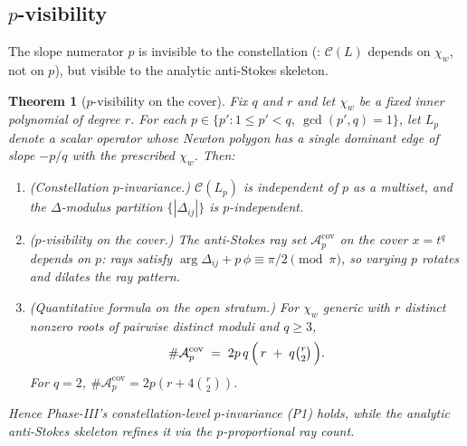 \documentclass[11pt,a4paper]{article}
\theoremstyle{plain}
\newtheorem{theorem}{Theorem}[section]
\theoremstyle{definition}
\theoremstyle{remark}
\newcommand{\Cl}{\mathcal{C}}
\newcommand{\Acov}{\mathcal{A}^{\mathrm{cov}}}
\newcommand{\Dij}{\Delta_{ij}}
\DeclareMathOperator{\arginline}{arg}
\begin{document}
\subsection{\texorpdfstring{$p$-visibility}{p-visibility}}\label{ssec:AT7}

The slope numerator $p$ is invisible to the constellation
(: $\Cl(L)$ depends on $\chi_w$, not on $p$), but
visible to the analytic anti-Stokes skeleton.

\begin{theorem}[$p$-visibility on the cover]\label{thm:AT7}
Fix $q$ and $r$ and let $\chi_w$ be a fixed inner polynomial of degree
$r$. For each $p \in \{p' : 1 \le p' < q,\ \gcd(p', q) = 1\}$, let $L_p$
denote a scalar operator whose Newton polygon has a single dominant edge
of slope $-p/q$ with the prescribed $\chi_w$. Then:
\begin{enumerate}[leftmargin=2em]
\item (Constellation $p$-invariance.) $\Cl(L_p)$ is independent of $p$ as
      a multiset, and the $\Delta$-modulus partition $\{|\Dij|\}$ is
      $p$-independent.
\item ($p$-visibility on the cover.) The anti-Stokes ray set $\Acov_p$
      on the cover $x = t^q$ \emph{depends} on $p$: rays satisfy
      $\arginline \Dij + p\, \phi \equiv \pi/2 \pmod{\pi}$, so varying $p$
      rotates and dilates the ray pattern.
\item (Quantitative formula on the open stratum.) For $\chi_w$ generic
      with $r$ distinct nonzero roots of pairwise distinct moduli and
      $q \ge 3$,
      \[
        \#\Acov_p
        \;=\;
        2 p\, q\, \Big(\, r \;+\; q \tbinom{r}{2}\,\Big).
      \]
      For $q = 2$, $\#\Acov_p = 2 p (r + 4 \binom{r}{2})$.
\end{enumerate}
Hence Phase-III's constellation-level $p$-invariance (P1) holds, while
the analytic anti-Stokes skeleton refines it via the
$p$-proportional ray count.
\end{theorem}
\end{document}
